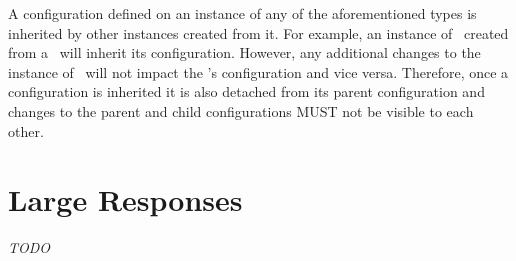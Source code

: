 A configuration defined on an instance of any of the aforementioned types is inherited by other instances created from it. For example, an instance of \Link\ created from a \Client\ will inherit its configuration. However, any additional changes to the instance of \Link\ will not impact the \Client's configuration and vice versa. Therefore, once a configuration is inherited it is also detached from its parent configuration and changes to the parent and child configurations MUST not be visible to each other.

\section{Large Responses}

\emph{TODO}










